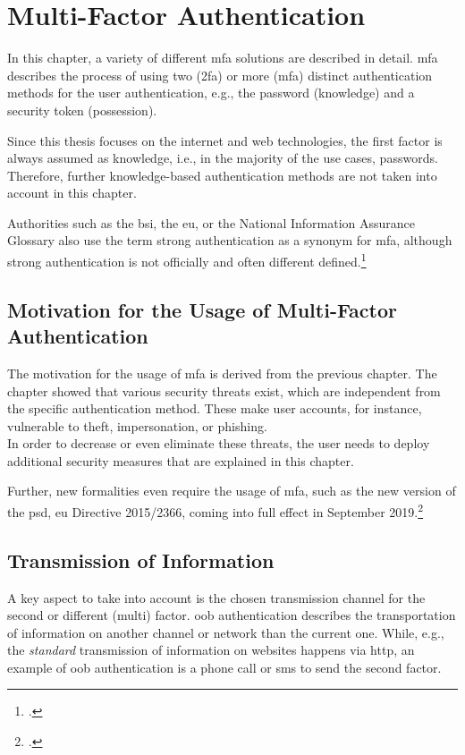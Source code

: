 \chapter{Multi-Factor Authentication}

In this chapter, a variety of different \gls{mfa} solutions are described in detail. \Gls{mfa} describes the process of using two (\gls{2fa}) or more (\gls{mfa}) distinct authentication methods for the user authentication, e.g., the password (knowledge) and a security token (possession).

Since this thesis focuses on the internet and web technologies, the first factor is always assumed as knowledge, i.e., in the majority of the use cases, passwords. Therefore, further knowledge-based authentication methods are not taken into account in this chapter.

Authorities such as the \gls{bsi}, the \gls{eu}, or the National Information Assurance Glossary also use the term \frqq strong authentication\flqq{} as a synonym for \gls{mfa}, although strong authentication is not officially and often different defined.\footcites[See][47]{CNSS4009}[See][11]{deutschland2018grundschutz}

\section{Motivation for the Usage of Multi-Factor Authentication}

The motivation for the usage of \gls{mfa} is derived from the previous chapter. The chapter showed that various security threats exist, which are independent from the specific authentication method. These make user accounts, for instance, vulnerable to theft, impersonation, or phishing.\\
 In order to decrease or even eliminate these threats, the user needs to deploy additional security measures that are explained in this chapter.
 
 Further, new formalities even require the usage of \gls{mfa}, such as the new version of the \gls{psd}, \gls{eu} Directive 2015/2366, coming into full effect in September 2019.\footcites[See][10]{NOCTOR20189}

\newpage

\section{Transmission of Information}

A key aspect to take into account is the chosen transmission channel for the second or different (multi) factor. \gls{oob} authentication describes the transportation of information on another channel or network than the current one. While, e.g., the \textit{standard} transmission of information on websites happens via \gls{http}, an example of \gls{oob} authentication is a phone call or \gls{sms} to send the second factor.

